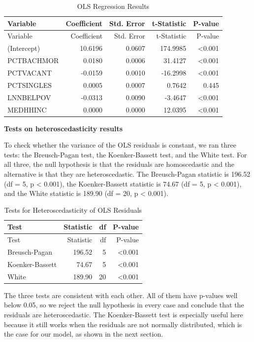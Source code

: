 \documentclass[
  12pt,
]{article}
\begin{document}
\begin{longtable}[]{@{}lrrrr@{}}
\caption{OLS Regression Results}\tabularnewline
\toprule\noalign{}
Variable & Coefficient & Std. Error & t-Statistic & P-value \\
\midrule\noalign{}
\endfirsthead
\toprule\noalign{}
Variable & Coefficient & Std. Error & t-Statistic & P-value \\
\midrule\noalign{}
\endhead
\bottomrule\noalign{}
\endlastfoot
(Intercept) & 10.6196 & 0.0607 & 174.9985 & \textless0.001 \\
PCTBACHMOR & 0.0180 & 0.0006 & 31.4127 & \textless0.001 \\
PCTVACANT & -0.0159 & 0.0010 & -16.2998 & \textless0.001 \\
PCTSINGLES & 0.0005 & 0.0007 & 0.7642 & 0.445 \\
LNNBELPOV & -0.0313 & 0.0090 & -3.4647 & \textless0.001 \\
MEDHHINC & 0.0000 & 0.0000 & 12.0395 & \textless0.001 \\
\end{longtable}

\textbf{Tests on heteroscedasticity results}

To check whether the variance of the OLS residuals is constant, we ran
three tests: the Breusch-Pagan test, the Koenker-Bassett test, and the
White test. For all three, the null hypothesis is that the residuals are
homoscedastic and the alternative is that they are heteroscedastic. The
Breusch-Pagan statistic is 196.52 (df = 5, p \textless{} 0.001), the
Koenker-Bassett statistic is 74.67 (df = 5, p \textless{} 0.001), and
the White statistic is 189.90 (df = 20, p \textless{} 0.001).

\begin{longtable}[]{@{}lrrr@{}}
\caption{Tests for Heteroscedasticity of OLS Residuals}\tabularnewline
\toprule\noalign{}
Test & Statistic & df & P-value \\
\midrule\noalign{}
\endfirsthead
\toprule\noalign{}
Test & Statistic & df & P-value \\
\midrule\noalign{}
\endhead
\bottomrule\noalign{}
\endlastfoot
Breusch-Pagan & 196.52 & 5 & \textless0.001 \\
Koenker-Bassett & 74.67 & 5 & \textless0.001 \\
White & 189.90 & 20 & \textless0.001 \\
\end{longtable}

The three tests are consistent with each other. All of them have
p-values well below 0.05, so we reject the null hypothesis in every case
and conclude that the residuals are heteroscedastic. The Koenker-Bassett
test is especially useful here because it still works when the residuals
are not normally distributed, which is the case for our model, as shown
in the next section.
\end{document}

